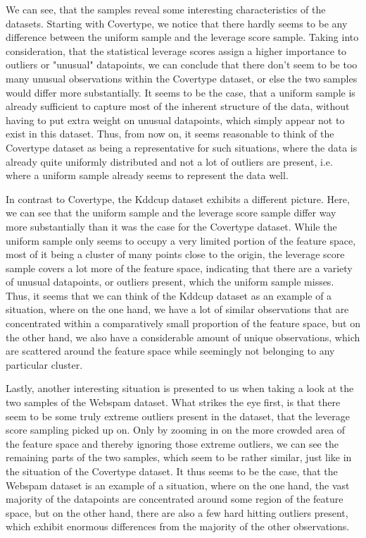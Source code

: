 We can see, that the samples reveal some interesting characteristics
of the datasets. Starting with Covertype, we notice that there
hardly seems to be any difference between the uniform sample and
the leverage score sample. Taking into consideration, that the
statistical leverage scores assign a higher importance to
outliers or "unusual" datapoints, we can conclude that there don't
seem to be too many unusual observations within the Covertype
dataset, or else the two samples would differ more substantially.
It seems to be the case, that a uniform sample is already
sufficient to capture most of the inherent structure of the data,
without having to put extra weight on unusual datapoints, which
simply appear not to exist in this dataset.
Thus, from now on, it seems reasonable to think of the
Covertype dataset as being
a representative for such situations, where the data is
already quite uniformly distributed and not a lot of outliers are
present, i.e. where a uniform sample already seems to
represent the data well.

In contrast to Covertype, the Kddcup dataset exhibits a different
picture. Here, we can see that the uniform sample and the leverage
score sample differ way more substantially than it was the case
for the Covertype dataset.
While the uniform sample only seems to occupy a very limited portion
of the feature space, most of it being a cluster of
many points close to the origin,
the leverage score sample covers a lot more
of the feature space,
indicating that there are a variety of unusual datapoints,
or outliers present,
which the uniform sample misses.
Thus, it seems that we can think of the Kddcup dataset as an
example of a situation,
where on the one hand, we have a lot of similar observations that
are concentrated within a comparatively small proportion of
the feature space, but on the other hand, we also have a
considerable amount of unique observations, which are scattered
around the feature space
while seemingly not belonging to any particular cluster.

Lastly, another interesting situation is presented to us when taking
a look at the two samples of the Webspam dataset.
What strikes the eye first, is that there seem to be some truly
extreme outliers present in the dataset, that the leverage score
sampling picked up on. Only by zooming in on the more crowded area
of the feature space and thereby ignoring those extreme outliers,
we can see the remaining parts of the two samples, which seem to
be rather similar, just like in the situation of the Covertype dataset.
It thus seems to be the case, that the Webspam dataset is an example
of a situation, where on the one hand, the vast majority of the
datapoints are concentrated around some region of the feature space,
but on the other hand, there are also a few hard hitting outliers present,
which exhibit enormous differences from the majority of the other
observations.

